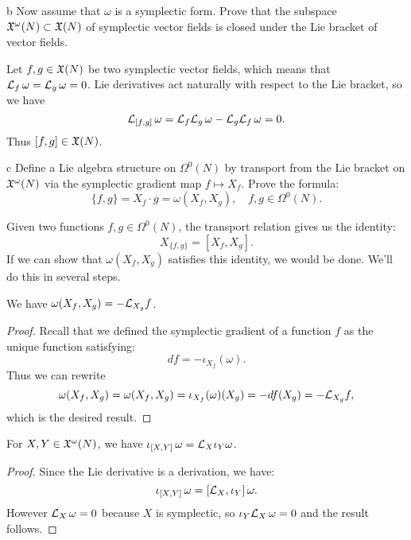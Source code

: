 \documentclass{pset}
\begin{document}
\begin{parts}
    \begin{part}{b}
        Now assume that $\omega$ is a symplectic form. Prove that the subspace $\mathfrak{X}^\omega(N)\subset \mathfrak{X}(N)$ of symplectic vector fields is closed under the Lie bracket of vector fields.
    \end{part}

    Let $f,g\in \mathfrak{X}(N)$ be two symplectic vector fields, which means that $\mathcal{L}_{f}\,\omega = \mathcal{L}_{g}\,\omega = 0$. Lie derivatives act naturally with respect to the Lie bracket, so we have
    \[
        \mathcal{L}_{[f,g]}\,\omega = \mathcal{L}_{f}\mathcal{L}_{g}\,{\omega} - \mathcal{L}_{g}\mathcal{L}_{f}\,{\omega} = 0
    .\] 
    Thus $[f,g]\in \mathfrak{X}(N)$.

    \begin{part}{c}
        Define a Lie algebra structure on $\Omega^0(N)$ by transport from the Lie bracket on $\mathfrak{X}^\omega(N)$ via the symplectic gradient map $f \mapsto X_f$. Prove the formula:
        \[
            \{f, g\} = X_f\cdot g = \omega\left(X_f, X_g\right),\quad f,g\in \Omega^0(N)
        .\] 
    \end{part}

    Given two functions $f,g \in \Omega^0(N)$, the transport relation gives us the identity:
    \[
        X_{\{f, g\}} = [X_f, X_g].
    \] 
    If we can show that $\omega(X_f, X_g)$ satisfies this identity, we would be done. We'll do this in several steps.
    
    \begin{claim}
        We have $\omega(X_f, X_g) = -\mathcal{L}_{X_g}{f}$.
    \end{claim}
    \begin{proof}Recall that we defined the symplectic gradient of a function $f$ as the unique function satisfying:
        \[
            df = -\iota_{X_f}(\omega)
        .\] 
        Thus we can rewrite
        \[
            \omega(X_f, X_g) = \omega(X_f, X_g) = \iota_{X_f}(\omega)(X_g) = -df(X_g) = -\mathcal{L}_{X_g}f,
        \]
        which is the desired result.
    \end{proof}

    \begin{claim}
        For $X,Y\in \mathfrak{X}^\omega(N)$, we have $\iota_{[X,Y]}\,\omega = \mathcal{L}_X \iota_Y \omega$.
    \end{claim}
    \begin{proof}
        Since the Lie derivative is a derivation, we have:
        \[
            \iota_{[X,Y]}\,\omega = \left[\mathcal{L}_{X}, \iota_Y\right]\omega
        .\] 
        However $\mathcal{L}_X\,\omega = 0$ because $X$ is symplectic, so $\iota_Y \mathcal{L}_X\,\omega = 0$ and the result follows.
    \end{proof}


\end{parts}
\end{document}
